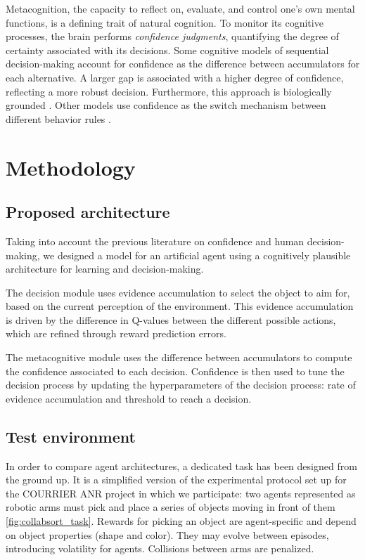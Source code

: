 \documentclass[10pt, a4paper]{collection-edmi}
\begin{document}
\begin{content}
Metacognition, the capacity to reflect on, evaluate, and control one's own mental functions, is a defining trait of natural cognition. To monitor its cognitive processes, the brain performs \textit{confidence judgments}, quantifying the degree of certainty associated with its decisions. Some cognitive models of sequential decision-making account for confidence as the difference between accumulators for each alternative. A larger gap is associated with a higher degree of confidence, reflecting a more robust decision. Furthermore, this approach is biologically grounded \cite{KepecsDecisionConfidence2008}. Other models use confidence as the switch mechanism between different behavior rules \cite{koechlinPROBE2012}.

\section{Methodology}

\subsection{Proposed architecture}

Taking into account the previous literature on confidence and human decision-making, we designed a model for an artificial agent using a cognitively plausible architecture for learning and decision-making.

The decision module uses evidence accumulation to select the object to aim for, based on the current perception of the environment. This evidence accumulation is driven by the difference in Q-values between the different possible actions, which are refined through reward prediction errors.

The metacognitive module uses the difference between accumulators to compute the confidence associated to each decision. Confidence is then used to tune the decision process by updating the hyperparameters of the decision process: rate of evidence accumulation and threshold to reach a decision.

\subsection{Test environment}

In order to compare agent architectures, a dedicated task has been designed from the ground up. It is a simplified version of the experimental protocol set up for the COURRIER ANR project in which we participate: two agents represented as robotic arms must pick and place a series of objects moving in front of them \ref{fig:collabsort_task}. Rewards for picking an object are agent-specific and depend on object properties (shape and color). They may evolve between episodes, introducing volatility for agents. Collisions between arms are penalized. 


\end{content}
\end{document}
